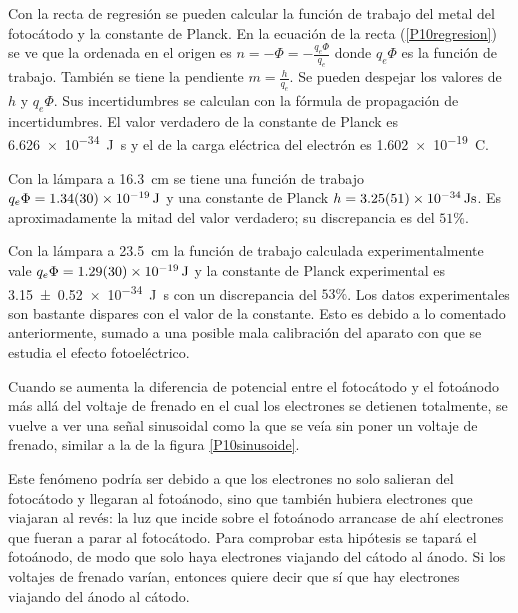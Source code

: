\documentclass[12pt]{article}
\numberwithin{table}{section}
\numberwithin{figure}{section}
\numberwithin{equation}{section}
\newcommand{\data}[3]{\SI{#1 \pm #2}{#3}}
\begin{document}
Con la recta de regresión se pueden calcular la función de trabajo del metal del fotocátodo y la constante de Planck. En la ecuación de la recta (\ref{P10regresion}) se ve que la ordenada en el origen es $n=-\Phi=-\frac{q_e\Phi}{q_e}$ donde $q_e\Phi$ es la función de trabajo. También se tiene la pendiente $m=\frac{h}{q_e}$. Se pueden despejar los valores de $h$ y $q_e\Phi$. Sus incertidumbres se calculan con la fórmula de propagación de incertidumbres. El  valor verdadero de la constante de Planck es \SI{6.626e-34}{J s} y el de la carga eléctrica del electrón es \SI{1.602e-19}{C}.

Con la lámpara a \SI{16.3}{cm} se tiene una función de trabajo $q_e\Phi= \data{1.34}{0.30e-19}{J}$ y una constante de Planck $h= \data{3.25}{0.51e-34}{J s}$. Es aproximadamente la mitad del valor verdadero; su discrepancia es del $51\%$.

Con la lámpara a \SI{23.5}{cm} la función de trabajo calculada experimentalmente vale $q_e\Phi= \data{1.29}{0.30e-19}{J}$ y la constante de Planck experimental es \data{3.15}{0.52e-34}{J s} con un discrepancia del $53\%$. Los datos experimentales son bastante dispares con el valor de la constante. Esto es debido a lo comentado anteriormente, sumado a una posible mala calibración del aparato con que se estudia el efecto fotoeléctrico.

Cuando se aumenta la diferencia de potencial entre el fotocátodo y el fotoánodo más allá del voltaje de frenado en el cual los electrones se detienen totalmente, se vuelve a ver una señal sinusoidal como la que se veía sin poner un voltaje de frenado, similar a la de la figura \ref{P10sinusoide}.

Este fenómeno podría ser debido a que los electrones no solo salieran del fotocátodo y llegaran al fotoánodo, sino que también hubiera electrones que viajaran al revés: la luz que incide sobre el fotoánodo arrancase de ahí electrones que fueran a parar al fotocátodo. Para comprobar esta hipótesis se tapará el fotoánodo, de modo que solo haya electrones viajando del cátodo al ánodo. Si los voltajes de frenado varían, entonces quiere decir que sí que hay electrones viajando del ánodo al cátodo.
\end{document}

